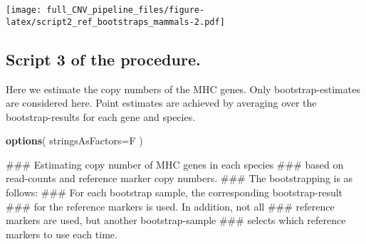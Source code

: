 \documentclass[]{article}
\newenvironment{Shaded}{\begin{snugshade}}{\end{snugshade}}
\newcommand{\KeywordTok}[1]{\textcolor[rgb]{0.13,0.29,0.53}{\textbf{#1}}}
\newcommand{\DataTypeTok}[1]{\textcolor[rgb]{0.13,0.29,0.53}{#1}}
\newcommand{\NormalTok}[1]{#1}
\begin{document}
\texttt{[image: full\_CNV\_pipeline\_files/figure-latex/script2\_ref\_bootstraps\_mammals-2.pdf]}

\subsection{Script 3 of the
procedure.}\label{script-3-of-the-procedure.}

Here we estimate the copy numbers of the MHC genes. Only
bootstrap-estimates are considered here. Point estimates are achieved by
averaging over the bootstrap-results for each gene and species.

\begin{Shaded}
\begin{Highlighting}[]
\KeywordTok{options}\NormalTok{( }\DataTypeTok{stringsAsFactors=}\NormalTok{F )}


\NormalTok{### Estimating copy number of MHC genes in each species}
\NormalTok{### based on read-counts and reference marker copy numbers.}
\NormalTok{### The bootstrapping is as follows:}
\NormalTok{### For each bootstrap sample, the corresponding bootstrap-result}
\NormalTok{### for the reference markers is used. In addition, not all}
\NormalTok{### reference markers are used, but another bootstrap-sample}
\NormalTok{### selects which reference markers to use each time.}


\end{Highlighting}
\end{Shaded}
\end{document}
